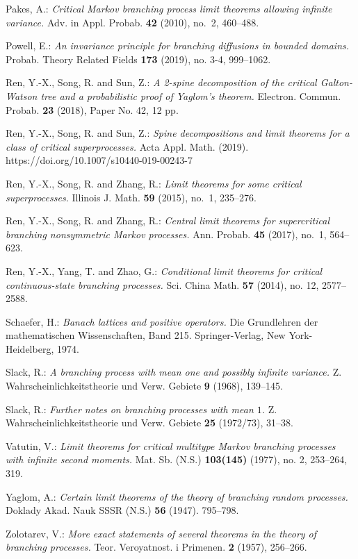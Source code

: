 \documentclass[12pt,a4paper]{amsart}
\theoremstyle{definition}
\numberwithin{equation}{section}
\begin{document}
\begin{thebibliography}{10}
	
	Pakes, A.:
	\emph{Critical {M}arkov branching process limit theorems allowing infinite variance.}
	Adv. in Appl. Probab. \textbf{42} (2010), no.~2, 460--488.
	
	
  Powell, E.:
  \emph{An invariance principle for branching diffusions in bounded domains.}
  Probab. Theory Related Fields  \textbf{173} (2019), no. 3-4, 999–1062.

  Ren, Y.-X., Song, R. and Sun, Z.:
  \emph{A 2-spine decomposition of the critical Galton-Watson tree and a probabilistic proof of Yaglom's theorem.}
  Electron. Commun. Probab. \textbf{23} (2018), Paper No. 42, 12 pp.
	
  Ren, Y.-X., Song, R. and Sun, Z.:
  \emph{Spine decompositions and limit theorems for a class of critical superprocesses.}
  Acta Appl. Math. (2019). https://doi.org/10.1007/s10440-019-00243-7

	Ren, Y.-X., Song, R. and Zhang, R.:
  \emph{Limit theorems for some critical superprocesses.}
	Illinois J. Math. \textbf{59} (2015), no.~1, 235--276.
	
	Ren, Y.-X., Song, R. and Zhang, R.:
	\emph{Central limit theorems for supercritical branching nonsymmetric {M}arkov processes.}
	Ann. Probab. \textbf{45} (2017), no.~1, 564--623.
	
	Ren, Y.-X., Yang, T. and Zhao, G.:
	\emph{Conditional limit theorems for critical continuous-state branching processes.}
	Sci. China Math. \textbf{57} (2014), no. 12, 2577–2588.
	
	Schaefer, H.:
	\emph{Banach lattices and positive operators.}
	Die Grundlehren der mathematischen Wissenschaften, Band 215. Springer-Verlag, New York-Heidelberg, 1974.
	
	Slack, R.:
	\emph{A branching process with mean one and possibly infinite variance.}
	Z. Wahrscheinlichkeitstheorie und Verw. Gebiete \textbf{9} (1968), 139--145.
	
	Slack, R.:
  \emph{Further notes on branching processes with mean {$1$}.}
	Z. Wahrscheinlichkeitstheorie und Verw. Gebiete \textbf{25} (1972/73), 31–38.
	
	Vatutin, V.:
	\emph{Limit theorems for critical multitype Markov branching processes with infinite second moments.}
	Mat. Sb. (N.S.) \textbf{103(145)} (1977), no. 2, 253–264, 319.

	Yaglom, A.:
	\emph{Certain limit theorems of the theory of branching random processes.}
	Doklady Akad. Nauk SSSR (N.S.) \textbf{56} (1947). 795–798.
	
	Zolotarev, V.:
	\emph{More exact statements of several theorems in the theory of branching processes.}
	Teor. Veroyatnost. i Primenen. \textbf{2} (1957), 256–266.
	
\end{thebibliography}
\end{document}
